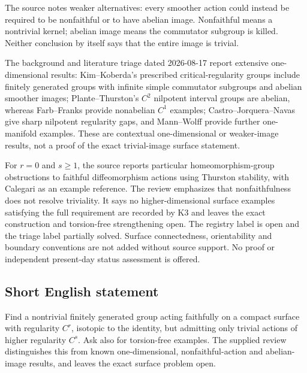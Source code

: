 \documentclass[11pt]{article}
\begin{document}
The source notes weaker alternatives: every smoother action could instead be required to be nonfaithful or to have abelian image. Nonfaithful means a nontrivial kernel; abelian image means the commutator subgroup is killed. Neither conclusion by itself says that the entire image is trivial.

The background and literature triage dated 2026-08-17 report extensive one-dimensional results: Kim--Koberda's prescribed critical-regularity groups include finitely generated groups with infinite simple commutator subgroups and abelian smoother images; Plante--Thurston's $C^2$ nilpotent interval groups are abelian, whereas Farb--Franks provide nonabelian $C^1$ examples; Castro--Jorquera--Navas give sharp nilpotent regularity gaps, and Mann--Wolff provide further one-manifold examples. These are contextual one-dimensional or weaker-image results, not a proof of the exact trivial-image surface statement.

For $r=0$ and $s\geq1$, the source reports particular homeomorphism-group obstructions to faithful diffeomorphism actions using Thurston stability, with Calegari as an example reference. The review emphasizes that nonfaithfulness does not resolve triviality. It says no higher-dimensional surface examples satisfying the full requirement are recorded by K3 and leaves the exact construction and torsion-free strengthening open. The registry label is open and the triage label partially solved. Surface connectedness, orientability and boundary conventions are not added without source support. No proof or independent present-day status assessment is offered.
\subsection{Short English statement}
Find a nontrivial finitely generated group acting faithfully on a compact surface with regularity $C^r$, isotopic to the identity, but admitting only trivial actions of higher regularity $C^s$. Ask also for torsion-free examples. The supplied review distinguishes this from known one-dimensional, nonfaithful-action and abelian-image results, and leaves the exact surface problem open.
\end{document}
